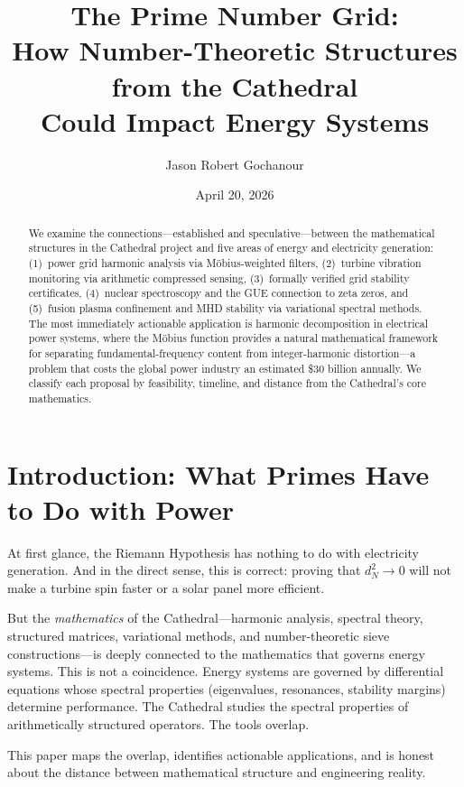 \documentclass[11pt,a4paper]{article}
\title{%
  The Prime Number Grid:\\
  How Number-Theoretic Structures from the Cathedral\\
  Could Impact Energy Systems%
}
\author{
  Jason Robert Gochanour
}
\date{April 20, 2026}
\begin{document}
\maketitle

\begin{abstract}
We examine the connections---established and speculative---between
the mathematical structures in the Cathedral project and five areas
of energy and electricity generation: (1)~power grid harmonic
analysis via M\"obius-weighted filters, (2)~turbine vibration
monitoring via arithmetic compressed sensing, (3)~formally verified
grid stability certificates, (4)~nuclear spectroscopy and the
GUE connection to zeta zeros, and (5)~fusion plasma confinement
and MHD stability via variational spectral methods. The most
immediately actionable application is harmonic decomposition in
electrical power systems, where the M\"obius function provides a
natural mathematical framework for separating fundamental-frequency
content from integer-harmonic distortion---a problem that costs the
global power industry an estimated \$30 billion annually. We
classify each proposal by feasibility, timeline, and distance from
the Cathedral's core mathematics.
\end{abstract}

\tableofcontents

\section{Introduction: What Primes Have to Do with Power}

At first glance, the Riemann Hypothesis has nothing to do with
electricity generation. And in the direct sense, this is correct:
proving that $d_N^2 \to 0$ will not make a turbine spin faster or a
solar panel more efficient.

But the \emph{mathematics} of the Cathedral---harmonic analysis,
spectral theory, structured matrices, variational methods, and
number-theoretic sieve constructions---is deeply connected to the
mathematics that governs energy systems. This is not a coincidence.
Energy systems are governed by differential equations whose spectral
properties (eigenvalues, resonances, stability margins) determine
performance. The Cathedral studies the spectral properties of
arithmetically structured operators. The tools overlap.

This paper maps the overlap, identifies actionable applications,
and is honest about the distance between mathematical structure
and engineering reality.
\end{document}
